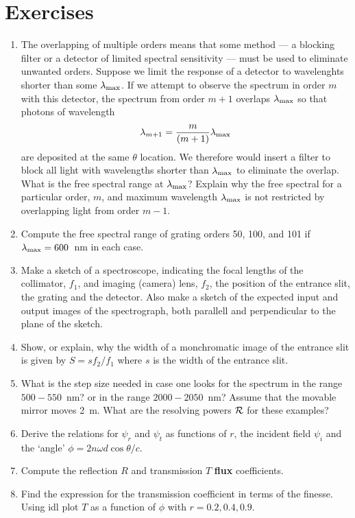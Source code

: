 \section{Exercises}
\begin{enumerate}
\item The overlapping of multiple orders means that some method --- a
  blocking filter or a detector of limited spectral sensitivity ---
  must be used to eliminate unwanted orders. Suppose we limit
  the response of a detector to wavelenghts shorter than some
  $\lambda_{\rm max}$. If we attempt to observe the spectrum in order
  $m$ with this detector, the spectrum from order $m+1$ overlaps
  $\lambda_{\rm max}$ so that photons of wavelength 
\[
\lambda_{m+1}=\frac{m}{(m+1)}\lambda_{\rm max}
\]
are deposited at the same $\theta$ location. We therefore would insert
a filter to block all light with wavelengths shorter than
$\lambda_{\rm max}$ to eliminate the overlap. What is the free spectral range at
  $\lambda_{\rm max}$? Explain why the free spectral for a particular
  order, $m$, and maximum wavelength $\lambda_{\rm max}$ is not
  restricted by overlapping light from order $m-1$.
\item Compute the free spectral range of grating orders 50, 100, and
  101 if $\lambda_{\rm max}=600$~nm in each case.
\item Make a sketch of a spectroscope, indicating the focal lengths
of the collimator, $f_1$, and imaging (camera) lens, $f_2$, the position of
the entrance slit, the grating and the detector. Also make a sketch
of the expected input and output images of the spectrograph, both
parallell and perpendicular to the plane of the sketch.
\item Show, or explain, why the width of a monchromatic image of the
  entrance slit is given by $S={sf_2/f_1}$ where $s$ is the width of
  the entrance slit.
\item What is the step size needed in case one looks for the spectrum
  in the range $500-550$~nm? or in the range $2000-2050$~nm? Assume
  that the movable mirror moves 2~m. What are the resolving powers
  ${\cal R}$ for these examples?
\item Derive the relations for $\psi_r$ and $\psi_t$ as functions of
  $r$, the incident field $\psi_i$ and the `angle' $\phi={2n\omega
    d\cos\theta/c}$. 
\item Compute the reflection $R$ and transmission $T$ {\bf flux}
  coefficients. 
\item Find the expression for the transmission coefficient in terms of
  the finesse. Using {\sc idl} plot $T$ as a function of $\phi$ with $r=0.2,0.4,0.9$.
\end{enumerate}
